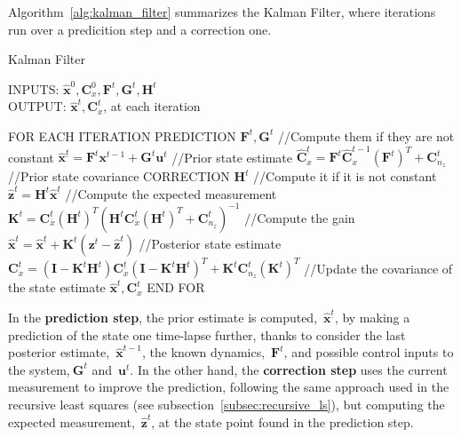 Algorithm~\ref{alg:kalman_filter} summarizes the Kalman Filter, where iterations run over a predicition step and a correction one. 
\begin{algorithm}
\caption{Kalman Filter}
INPUTS: $\hat{\mathbf{x}}^0,\mathbf{C}^0_x,\mathbf{F}^t,\mathbf{G}^t,\mathbf{H}^t$\\
OUTPUT: $\hat{\mathbf{x}}^t,\mathbf{C}^t_x$, at each iteration
\begin{algorithmic}
\STATE FOR EACH ITERATION
\STATE \hspace{0.5cm} PREDICTION
\STATE \hspace{1cm} $\mathbf{F}^t,\mathbf{G}^t$ //Compute them if they are not constant
\STATE \hspace{1cm} $\hat{\mathbf{x}}^{\underline{t}} = \mathbf{F}^t\mathbf{x}^{t-1} + \mathbf{G}^t\mathbf{u}^{t}$ //Prior state estimate
\STATE \hspace{1cm} $\hat{\mathbf{C}}^{\underline{t}}_x = \mathbf{F}^t\hat{\mathbf{C}}^{t-1}_x(\mathbf{F}^t)^T + \mathbf{C}^t_{n_z}$ //Prior state covariance
\STATE \hspace{0.5cm} CORRECTION
\STATE \hspace{1cm} $\mathbf{H}^t$ //Compute it if it is not constant
\STATE \hspace{1cm} $\hat{\mathbf{z}}^t = \mathbf{H}^t\hat{\mathbf{x}}^{\underline{t}}$ //Compute the expected measurement 
\STATE \hspace{1cm} $\mathbf{K}^t = \mathbf{C}^{\underline{t}}_x(\mathbf{H}^t)^T(\mathbf{H}^t\mathbf{C}^{\underline{t}}_x(\mathbf{H}^t)^T+\mathbf{C}^t_{n_z})^{-1}$ 
//Compute the gain
\STATE \hspace{1cm} $\hat{\mathbf{x}}^t = \hat{\mathbf{x}}^{\underline{t}} + \mathbf{K}^t(\mathbf{z}^t - \hat{\mathbf{z}}^t)$ //Posterior state estimate
\STATE \hspace{1cm} $\mathbf{C}^t_{x} = (\mathbf{I}-\mathbf{K}^t\mathbf{H}^t)\mathbf{C}^{\underline{t}}_x(\mathbf{I}-\mathbf{K}^t\mathbf{H}^t)^T
		    + \mathbf{K}^t\mathbf{C}^t_{n_z}(\mathbf{K}^t)^T$ //Update the covariance of the state estimate
\RETURN $\hat{\mathbf{x}}^t,\mathbf{C}^t_x$		    
\STATE END FOR
\end{algorithmic}
\label{alg:kalman_filter}
\end{algorithm}

In the \textbf{prediction step}, the prior estimate is computed,~$\hat{\mathbf{x}}^{\underline{t}}$, by making a prediction of the state one time-lapse further, thanks to consider the last posterior estimate,~$\hat{\mathbf{x}}^{t-1}$, the known dynamics,~$\mathbf{F}^t$, and possible control inputs to the system,$~\mathbf{G}^t$ and~$\mathbf{u}^t$. In the other hand, the \textbf{correction step} uses the current measurement to improve the prediction, following the same approach used in the recursive least squares (see subsection~\ref{subsec:recursive_ls}), but computing the expected measurement,~$\hat{\mathbf{z}}^t$, at the state point found in the prediction step. 

